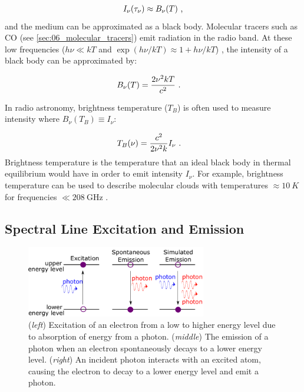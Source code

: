 \begin{equation}
    \begin{aligned}
        I_\nu\qty(\tau_\nu)\approx B_\nu\qty(T) \text{ ,}
    \end{aligned}
\end{equation}
\noindent and the medium can be approximated as a black body. Molecular tracers such as CO (see \autoref{sec:06_molecular_tracers}) emit radiation in the radio band. At these low frequencies ($h\nu\ll kT$ and $\exp(h\nu/kT)\approx1+h\nu/kT$) , the intensity of a black body can be approximated by:

\begin{equation}
    \begin{aligned}
        B_\nu\qty(T)&=\frac{2\nu^2kT}{c^2}\text{ .}
    \end{aligned}
\end{equation}

In radio astronomy, brightness temperature ($T_B$) is often used to measure intensity where $B_\nu(T_B)\equiv I_\nu$:

\begin{equation}
    \begin{aligned}
        T_B\qty(\nu)&=\frac{c^2}{2\nu^2 k}I_\nu\text{ .}
    \end{aligned} \label{eq:chapter_6_brightness_temp}
\end{equation}
\noindent Brightness temperature is the temperature that an ideal black body in thermal equilibrium would have in order to emit intensity $I_\nu$. For example, brightness temperature can be used to describe molecular clouds with temperatures $\approx 10~\si{K}$ for frequencies $\ll 208~\si{\giga\hertz}$ \citep{2011hea..book.....L}.

\subsection{Spectral Line Excitation and Emission} \label{sec:interstellar_medium_excitation_emission}

\begin{figure}[h]
	\centering
	\includegraphics[width=0.7\textwidth]{06_Interstellar_Medium/Images/Theory/emission.pdf}
	\caption{(\textit{left}) Excitation of an electron from a low to higher energy level due to absorption of energy from a photon. (\textit{middle}) The emission of a photon when an electron spontaneously decays to a lower energy level. (\textit{right}) An incident photon interacts with an excited atom, causing the electron to decay to a lower energy level and emit a photon.}
	\label{fig:absorption_emission}
\end{figure}


